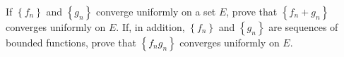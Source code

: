 \begin{exercise}
	If $\left\lbrace f_n \right\rbrace$ and $\left\lbrace g_n \right\rbrace$ converge uniformly on a set $E$, prove that $\left\lbrace f_n + g_n \right\rbrace$ converges uniformly on $E$. If, in addition, $\left\lbrace f_n \right\rbrace$ and $\left\lbrace g_n \right\rbrace$ are sequences of bounded functions, prove that $\left\lbrace f_ng_n \right\rbrace$ converges uniformly on $E$.
\end{exercise}
